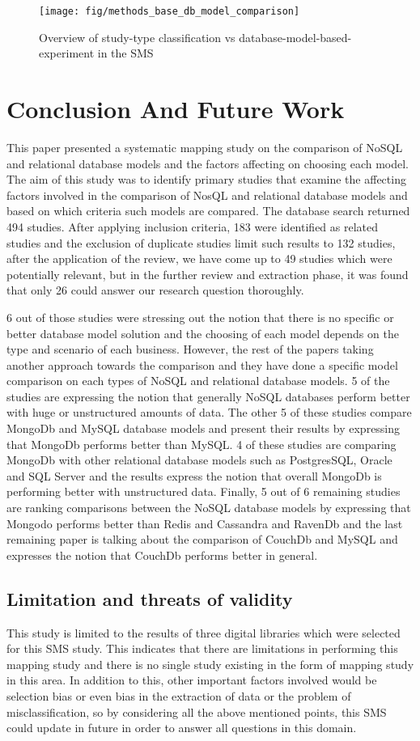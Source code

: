 \documentclass[sigconf,nonacm]{acmart}
\begin{document}
\begin{figure}[H]
  \centering
  \texttt{[image: fig/methods\_base\_db\_model\_comparison]}
  \caption{Overview of study-type classification vs database-model-based-experiment in the SMS}
\end{figure}


\section{Conclusion And Future Work}
This paper presented a systematic mapping study on the comparison of NoSQL and relational database models and the factors affecting on choosing each model. The aim of this study was to identify primary studies that examine the affecting factors involved in the comparison of NosQL and relational database models and based on which criteria such models are compared. The database search returned 494 studies. After applying inclusion criteria, 183 were identified as related studies and the exclusion of duplicate studies limit such results to 132 studies,  after the application of the review, we have come up to 49 studies which were potentially relevant, but in the further review and extraction phase, it was found that only 26 could answer our research question thoroughly.

6 out of those studies were stressing out the notion that there is no specific or better database model solution and the choosing of each model depends on the type and scenario of each business. However, the rest of the papers taking another approach towards the comparison and they have done a specific model comparison on each types of NoSQL and relational database models. 5 of the studies are expressing the notion that generally NoSQL databases perform better with huge or unstructured amounts of data. The other 5 of these studies compare MongoDb and MySQL database models and present their results by expressing that MongoDb performs better than MySQL. 4 of these studies are comparing MongoDb with other relational database models such as PostgresSQL, Oracle and SQL Server and the results express the notion that overall MongoDb is performing better with unstructured data. Finally, 5 out of 6 remaining studies are ranking comparisons between the NoSQL database models by expressing that Mongodo performs better than Redis and Cassandra and RavenDb and the last remaining paper is talking about the comparison of CouchDb and MySQL and expresses the notion that CouchDb performs better in general.
\subsection{Limitation and threats of validity}
This study is limited to the results of three digital libraries which were selected for this SMS study. This indicates that there are limitations in performing this mapping study and there is no single study existing in the form of mapping study in this area. In addition to this, other important factors involved would be selection bias or even bias in the extraction of data or the problem of misclassification, so by considering all the above mentioned points, this SMS could update in future in order to answer all questions in this domain. 
\end{document}
